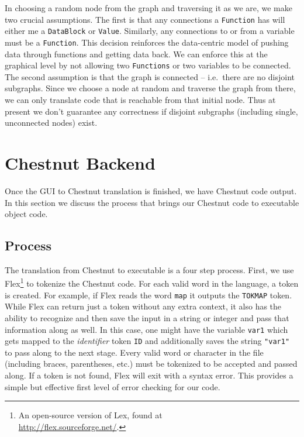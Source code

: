\documentclass[twocolumn]{article}
\renewcommand{\|}{\origbar} %
\newcommand{\code}[1]{\texttt{#1}}
\begin{document}
In choosing a random node from the graph and traversing it as we are, we make two crucial assumptions. The first is that any connections a \code{Function} has will either me a \code{DataBlock} or \code{Value}. Similarly, any connections to or from a variable must be a \code{Function}. This decision reinforces the data-centric model of pushing data through functions and getting data back. We can enforce this at the graphical level by not allowing two \code{Functions} or two variables to be connected. The second assumption is that the graph is connected -- i.e.\ there are no disjoint subgraphs. Since we choose a node at random and traverse the graph from there, we can only translate code that is reachable from that initial node. Thus at present we don't guarantee any correctness if disjoint subgraphs (including single, unconnected nodes) exist.

\section{Chestnut Backend}
\label{sec:chestnutBackend}

Once the GUI to Chestnut translation is finished, we have Chestnut code output. In this section we discuss the process that brings our Chestnut code to executable object code.

\subsection{Process}

The translation from Chestnut to executable is a four step process. First, we use Flex\footnote{An open-source version of Lex, found at \\ \url{http://flex.sourceforge.net/}.} to tokenize the Chestnut code. For each valid word in the language, a token is created. For example, if Flex reads the word \code{map} it outputs the \code{TOKMAP} token. While Flex can return just a token without any extra context, it also has the ability to recognize and then save the input in a string or integer and pass that information along as well. In this case, one might have the variable \code{var1} which gets mapped to the {\em identifier} token \code{ID} and additionally saves the string \code{"var1"} to pass along to the next stage. Every valid word or character in the file (including braces, parentheses, etc.) must be tokenized to be accepted and passed along. If a token is not found, Flex will exit with a syntax error. This provides a simple but effective first level of error checking for our code.
\end{document}
